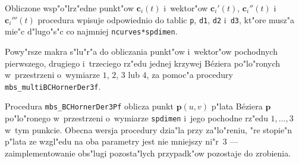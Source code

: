 Obliczone wsp"o"lrz"edne punkt"ow $\bm{c}_i(t)$ i~wektor"ow $\bm{c}_i'(t)$,
$\bm{c}_i''(t)$ i~$\bm{c}_i'''(t)$ procedura
wpisuje odpowiednio do tablic \texttt{p}, \texttt{d1}, \texttt{d2}
i~\texttt{d3}, kt"ore musz"a mie"c d"lugo"s"c co najmniej
\texttt{ncurves*spdimen}.

\vspace{\bigskipamount}
Powy"rsze makra s"lu"r"a do obliczania punkt"ow i~wektor"ow pochodnych
pierwszego, drugiego i~trzeciego rz"edu jednej krzywej B\'{e}ziera
po"lo"ronych w~przestrzeni o~wymiarze $1$, $2$, $3$ lub $4$, za pomoc"a
procedury \texttt{mbs\_multiBCHornerDer3f}.

\vspace{\bigskipamount}
Procedura \texttt{mbs\_BCHornerDer3Pf} oblicza punkt $\bm{p}(u,v)$
p"lata B\'{e}ziera $\bm{p}$ po"lo"ronego w~przestrzeni o~wymiarze
\texttt{spdimen} i~jego pochodne rz"edu $1,\ldots,3$ w~tym punkcie. Obecna
wersja procedury dzia"la przy za"lo"reniu, "re stopie"n p"lata ze wzgl"edu na
oba parametry jest nie mniejszy ni"r~$3$ --- zaimplementowanie obs"lugi
pozosta"lych przypadk"ow pozostaje do zrobienia.

